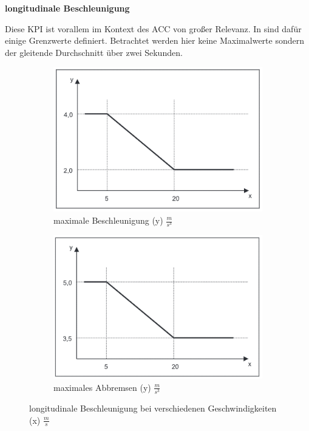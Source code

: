 \bigskip\noindent\textbf{longitudinale Beschleunigung}

\noindent Diese KPI ist vorallem im Kontext des ACC von großer Relevanz. In \cite{ISO15622} sind dafür einige Grenzwerte definiert. Betrachtet werden hier keine Maximalwerte sondern der gleitende Durchschnitt über zwei Sekunden.
\begin{figure}
    \centering
    \begin{subfigure}[b]{.4\linewidth}
        \centering
        \includegraphics[width=\textwidth]{figures/3_Implementierung/max_acceleration.png}
        \caption{maximale Beschleunigung (y) $\frac{m}{s^{3}}$}
        \label{fig:max_acceleration}
    \end{subfigure}
    \hfill
    \begin{subfigure}[b]{.4\linewidth}
        \centering
        \includegraphics[width=\textwidth]{figures/3_Implementierung/max_deceleration.png}
        \caption{maximales Abbremsen (y) $\frac{m}{s^{3}}$}
        \label{fig:max_deceleration}
    \end{subfigure}
    \caption{longitudinale Beschleunigung bei verschiedenen Geschwindigkeiten (x) $\frac{m}{s}$ \cite{ISO15622}}
    \label{fig:iso_acceleration}
\end{figure}

